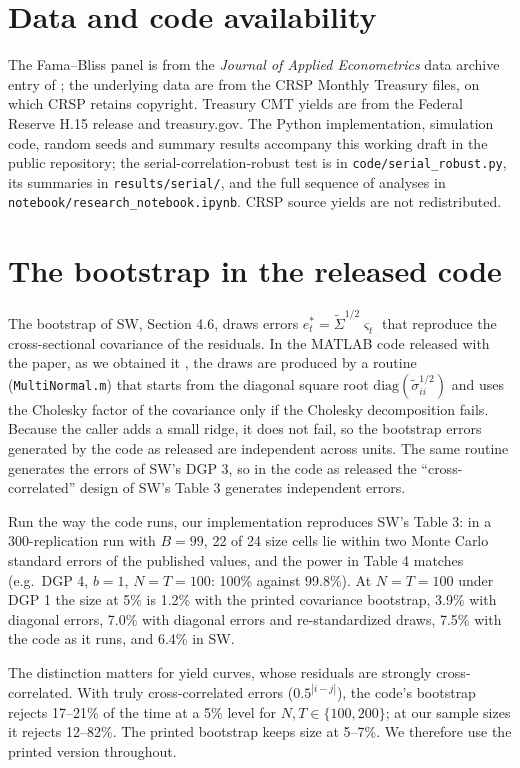 \documentclass[11pt]{article}
\begin{document}
\section*{Data and code availability}

The Fama--Bliss panel is from the \emph{Journal of Applied Econometrics} data archive entry of \citet{JKV2014}; the underlying data are from the CRSP Monthly Treasury files, on which CRSP retains copyright. Treasury CMT yields are from the Federal Reserve H.15 release and treasury.gov. The Python implementation, simulation code, random seeds and summary results accompany this working draft in the public repository; the serial-correlation-robust test is in \texttt{code/serial\_robust.py}, its summaries in \texttt{results/serial/}, and the full sequence of analyses in \texttt{notebook/research\_notebook.ipynb}. CRSP source yields are not redistributed.

\appendix

\section{The bootstrap in the released code}\label{app.bootstrap}

The bootstrap of SW, Section 4.6, draws errors $e^*_t=\tilde\Sigma^{1/2}\varsigma_t$ that reproduce the cross-sectional covariance of the residuals. In the MATLAB code released with the paper, as we obtained it , the draws are produced by a routine (\texttt{MultiNormal.m}) that starts from the diagonal square root $\mathrm{diag}(\tilde\sigma_{ii}^{1/2})$ and uses the Cholesky factor of the covariance only if the Cholesky decomposition fails. Because the caller adds a small ridge, it does not fail, so the bootstrap errors generated by the code as released are independent across units. The same routine generates the errors of SW's DGP 3, so in the code as released the ``cross-correlated'' design of SW's Table 3 generates independent errors.

Run the way the code runs, our implementation reproduces SW's Table 3: in a 300-replication run with $B=99$, 22 of 24 size cells lie within two Monte Carlo standard errors of the published values, and the power in Table 4 matches (e.g.\ DGP 4, $b=1$, $N=T=100$: 100\% against 99.8\%). At $N=T=100$ under DGP 1 the size at 5\% is 1.2\% with the printed covariance bootstrap, 3.9\% with diagonal errors, 7.0\% with diagonal errors and re-standardized draws, 7.5\% with the code as it runs, and 6.4\% in SW.

The distinction matters for yield curves, whose residuals are strongly cross-correlated. With truly cross-correlated errors ($0.5^{|i-j|}$), the code's bootstrap rejects 17--21\% of the time at a 5\% level for $N,T\in\{100,200\}$; at our sample sizes it rejects 12--82\%. The printed bootstrap keeps size at 5--7\%. We therefore use the printed version throughout.
\end{document}
